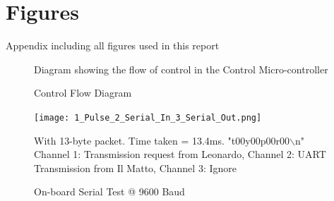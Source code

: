 \documentclass[a4paper,11pt]{article}
\begin{document}
\section{Figures}
\label{app:Figures}
Appendix including all figures used in this report
\begin{figure}[!h]
    
    \caption{Control Flow Diagram}
    \medskip
    \small
    Diagram showing the flow of control in the Control Micro-controller
    \label{fig:Control Flow}
\end{figure}
\newpage
\begin{figure}[!ht]
    \texttt{[image: 1\_Pulse\_2\_Serial\_In\_3\_Serial\_Out.png]}
    \caption{On-board Serial Test @ 9600 Baud}
    \medskip
    \small
    \centering
    With 13-byte packet. Time taken = 13.4ms. "t00y00p00r00$\backslash$n"\\ Channel 1: Transmission request from Leonardo, Channel 2: UART Transmission from Il Matto, Channel 3: Ignore 
    \label{fig:9600 Baud}
\end{figure}
\end{document}
